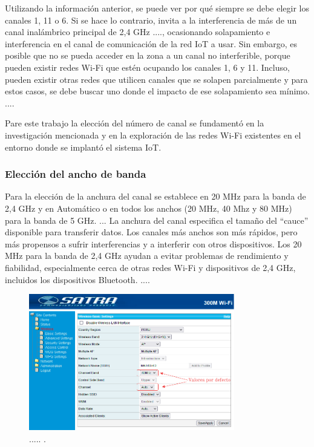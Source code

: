 Utilizando la información anterior, se puede ver por qué siempre se debe elegir los canales 1, 11 o 6. Si se hace lo contrario, invita a la interferencia de más de un canal inalámbrico principal de 2,4 GHz ...., ocasionando solapamiento e interferencia en el canal de comunicación de la red IoT a usar. Sin embargo, es posible que no se pueda acceder en la zona a un canal no interferible, porque pueden existir redes Wi-Fi que estén ocupando los canales 1, 6 y 11. Incluso, pueden existir otras redes que utilicen canales que se solapen parcialmente y para estos casos, se debe buscar uno donde el impacto de ese solapamiento sea mínimo. ....

Pare este trabajo la elección del número de canal se fundamentó en la investigación mencionada y en la exploración de las redes Wi-Fi existentes en el entorno donde se implantó el sistema IoT.

\subsubsection{Elección del ancho de banda}

Para la elección de la anchura del canal se establece en 20 MHz para la banda de 2,4 GHz y en Automático o en todos los anchos (20 MHz, 40 Mhz y 80 MHz) para la banda de 5 GHz. ... La anchura del canal especifica el tamaño del ``cauce'' disponible para transferir datos. Los canales más anchos son más rápidos, pero más propensos a sufrir interferencias y a interferir con otros dispositivos. Los 20 MHz para la banda de 2,4 GHz ayudan a evitar problemas de rendimiento y fiabilidad, especialmente cerca de otras redes Wi-Fi y dispositivos de 2,4 GHz, incluidos los dispositivos Bluetooth. ....

\begin{figure}[htpb]
\centering 
\includegraphics[width=0.8\textwidth]{./Figures/configuracioncanal.png}
\caption{..... .}
\label{fig:configuracioncanal}
\end{figure}

